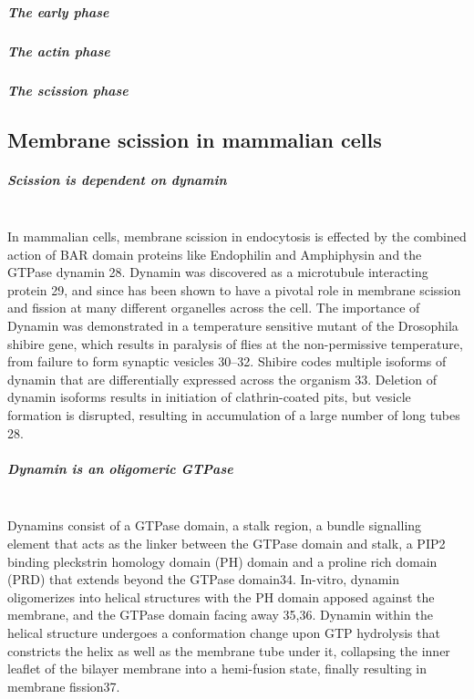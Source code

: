 		\subparagraph{The early phase}
		\subparagraph{The actin phase}
		\subparagraph{The scission phase}
		
		
	\subsection{Membrane scission in mammalian cells}
		\subparagraph{Scission is dependent on dynamin} 
\mbox{} \\
		 In mammalian cells, membrane scission in endocytosis is effected by the combined action of BAR domain proteins like Endophilin and Amphiphysin and the GTPase dynamin 28.  Dynamin was discovered as a microtubule interacting protein 29, and since has been shown to have a pivotal role in membrane scission and fission at many different organelles across the cell. The importance of Dynamin was demonstrated in a temperature sensitive mutant of the Drosophila shibire gene, which results in paralysis of flies at the non-permissive temperature, from failure to form synaptic vesicles 30–32. Shibire codes multiple isoforms of dynamin that are differentially expressed across the organism 33. Deletion of dynamin isoforms results in initiation of clathrin-coated pits, but vesicle formation is disrupted, resulting in accumulation of a large number of long tubes 28. 

		 
		\subparagraph{Dynamin is an oligomeric GTPase}
\mbox{} \\ 
Dynamins consist of a GTPase domain, a stalk region, a bundle signalling element that acts as the linker between the GTPase domain and stalk, a PIP2 binding pleckstrin homology domain (PH) domain and a proline rich domain (PRD) that extends beyond the GTPase domain34. In-vitro, dynamin oligomerizes into helical structures with the PH domain apposed against the membrane, and the GTPase domain facing away 35,36. Dynamin within the helical structure undergoes a conformation change upon GTP hydrolysis that constricts the helix as well as the membrane tube under it, collapsing the inner leaflet of the bilayer membrane into a hemi-fusion state, finally resulting in membrane fission37.

